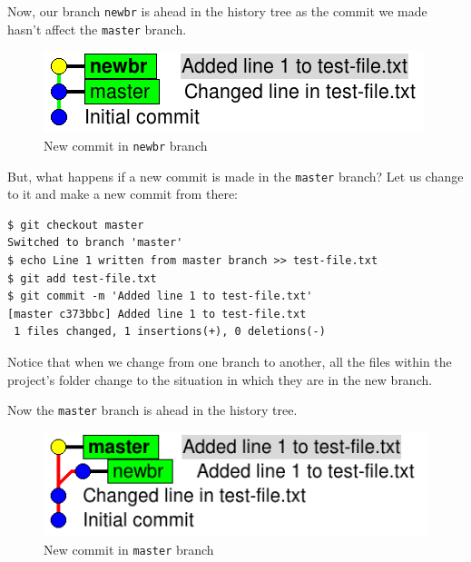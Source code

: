 \documentclass[a4paper,10pt]{article}
\newenvironment{terminal}
  {
    \vspace{+10pt}
    \begin{center}
    \begin{minipage}{0.95\textwidth}
    \begin{framed}
  }
  {
    \end{framed}
    \end{minipage}
    \end{center}
    \vspace{+10pt}
  }
\begin{document}
Now, our branch \texttt{newbr} is ahead in the history tree as the
commit we made hasn't affect the \texttt{master} branch.

\begin{figure}[h]
  \begin{center}
    \includegraphics[scale=0.5]{git_example-05}
  \end{center}
  \caption{New commit in \texttt{newbr} branch}
\end{figure}

But, what happens if a new commit is made in the \texttt{master}
branch? Let us change to it and make a new commit from there:

\begin{terminal}
\begin{verbatim}
$ git checkout master
Switched to branch 'master'
$ echo Line 1 written from master branch >> test-file.txt
$ git add test-file.txt
$ git commit -m 'Added line 1 to test-file.txt'
[master c373bbc] Added line 1 to test-file.txt
 1 files changed, 1 insertions(+), 0 deletions(-)
\end{verbatim}
\end{terminal}

\begin{tip}
Notice that when we change from one branch to another, all the files
within the project's folder change to the situation in which they are
in the new branch.
\end{tip}

Now the \texttt{master} branch is ahead in the history tree.

\begin{figure}[h]
  \begin{center}
    \includegraphics[scale=0.5]{git_example-06}
  \end{center}
  \caption{New commit in \texttt{master} branch}
\end{figure}
\end{document}

